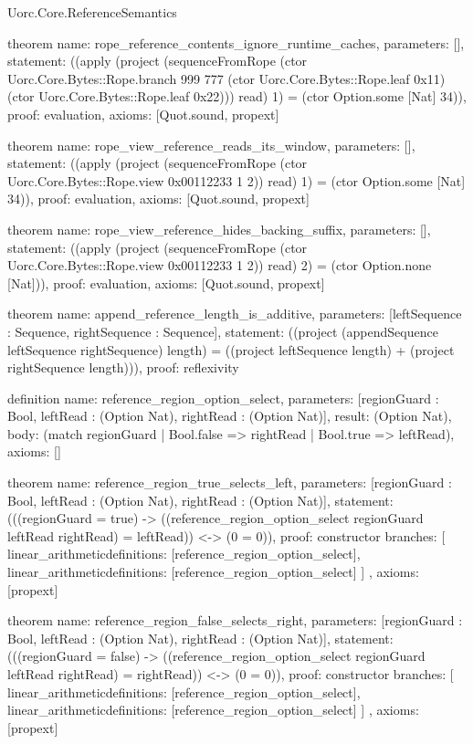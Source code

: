 \begin{lexlean}{Uorc.Core.ReferenceSemantics}
\begin{semanticmodule}
theorem{
  name: rope_reference_contents_ignore_runtime_caches,
  parameters: [],
  statement: ((apply (project (sequenceFromRope (ctor Uorc.Core.Bytes::Rope.branch 999 777 (ctor Uorc.Core.Bytes::Rope.leaf 0x11) (ctor Uorc.Core.Bytes::Rope.leaf 0x22))) read) 1) = (ctor Option.some [Nat] 34)),
  proof: evaluation{},
  axioms: [Quot.sound, propext]
}

theorem{
  name: rope_view_reference_reads_its_window,
  parameters: [],
  statement: ((apply (project (sequenceFromRope (ctor Uorc.Core.Bytes::Rope.view 0x00112233 1 2)) read) 1) = (ctor Option.some [Nat] 34)),
  proof: evaluation{},
  axioms: [Quot.sound, propext]
}

theorem{
  name: rope_view_reference_hides_backing_suffix,
  parameters: [],
  statement: ((apply (project (sequenceFromRope (ctor Uorc.Core.Bytes::Rope.view 0x00112233 1 2)) read) 2) = (ctor Option.none [Nat])),
  proof: evaluation{},
  axioms: [Quot.sound, propext]
}

theorem{
  name: append_reference_length_is_additive,
  parameters: [leftSequence : Sequence, rightSequence : Sequence],
  statement: ((project (appendSequence leftSequence rightSequence) length) = ((project leftSequence length) + (project rightSequence length))),
  proof: reflexivity{}
}

definition{
  name: reference_region_option_select,
  parameters: [regionGuard : Bool, leftRead : (Option Nat), rightRead : (Option Nat)],
  result: (Option Nat),
  body: (match regionGuard | Bool.false => rightRead | Bool.true => leftRead),
  axioms: []
}

theorem{
  name: reference_region_true_selects_left,
  parameters: [regionGuard : Bool, leftRead : (Option Nat), rightRead : (Option Nat)],
  statement: (((regionGuard = true) -> ((reference_region_option_select regionGuard leftRead rightRead) = leftRead)) <-> (0 = 0)),
  proof: constructor{
    branches: [
      linear_arithmetic{definitions: [reference_region_option_select]},
      linear_arithmetic{definitions: [reference_region_option_select]}
    ]
  },
  axioms: [propext]
}

theorem{
  name: reference_region_false_selects_right,
  parameters: [regionGuard : Bool, leftRead : (Option Nat), rightRead : (Option Nat)],
  statement: (((regionGuard = false) -> ((reference_region_option_select regionGuard leftRead rightRead) = rightRead)) <-> (0 = 0)),
  proof: constructor{
    branches: [
      linear_arithmetic{definitions: [reference_region_option_select]},
      linear_arithmetic{definitions: [reference_region_option_select]}
    ]
  },
  axioms: [propext]
}


\end{semanticmodule}
\end{lexlean}
